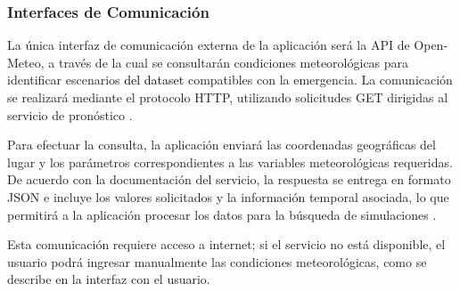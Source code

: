 \subsubsection{Interfaces de Comunicación}{\color{black}
La única interfaz de comunicación externa de la aplicación será la API de Open-Meteo, a través de la cual se consultarán condiciones meteorológicas para identificar escenarios \textcolor{black}{del dataset} compatibles con la emergencia. La comunicación se realizará mediante el protocolo HTTP, utilizando solicitudes GET dirigidas al servicio de pronóstico \cite{openmeteo_docs}.

Para efectuar la consulta, la aplicación enviará las coordenadas geográficas del lugar y los parámetros correspondientes a las variables meteorológicas requeridas. De acuerdo con la documentación del servicio, la respuesta se entrega en formato JSON e incluye los valores solicitados y la información temporal asociada, lo que permitirá a la aplicación procesar los datos para la búsqueda de simulaciones \cite{openmeteo_docs}.

Esta comunicación requiere acceso a internet; si el servicio no está disponible, el usuario podrá ingresar manualmente las condiciones meteorológicas, como se describe en la interfaz con el usuario.
}
